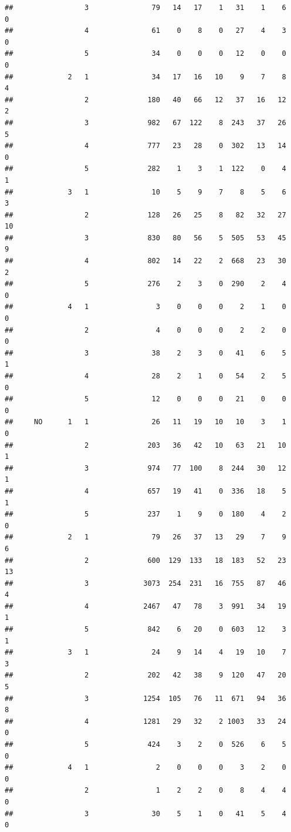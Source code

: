 \documentclass{article}\usepackage[]{graphicx}\usepackage[]{xcolor}
\makeatletter
\newenvironment{kframe}{%
 \def\at@end@of@kframe{}%
 \ifinner\ifhmode%
  \def\at@end@of@kframe{\end{minipage}}%
  \begin{minipage}{\columnwidth}%
 \fi\fi%
 \def\FrameCommand##1{\hskip\@totalleftmargin \hskip-\fboxsep
 \colorbox{shadecolor}{##1}\hskip-\fboxsep
     \hskip-\linewidth \hskip-\@totalleftmargin \hskip\columnwidth}%
 \MakeFramed {\advance\hsize-\width
   \@totalleftmargin\z@ \linewidth\hsize
   \@setminipage}}%
 {\par\unskip\endMakeFramed%
 \at@end@of@kframe}
\newenvironment{knitrout}{}{} %
\makeatother
\begin{document}
\begin{knitrout}
\begin{kframe}
\begin{verbatim}
##                 3               79   14   17    1   31    1    6    0
##                 4               61    0    8    0   27    4    3    0
##                 5               34    0    0    0   12    0    0    0
##             2   1               34   17   16   10    9    7    8    4
##                 2              180   40   66   12   37   16   12    2
##                 3              982   67  122    8  243   37   26    5
##                 4              777   23   28    0  302   13   14    0
##                 5              282    1    3    1  122    0    4    1
##             3   1               10    5    9    7    8    5    6    3
##                 2              128   26   25    8   82   32   27   10
##                 3              830   80   56    5  505   53   45    9
##                 4              802   14   22    2  668   23   30    2
##                 5              276    2    3    0  290    2    4    0
##             4   1                3    0    0    0    2    1    0    0
##                 2                4    0    0    0    2    2    0    0
##                 3               38    2    3    0   41    6    5    1
##                 4               28    2    1    0   54    2    5    0
##                 5               12    0    0    0   21    0    0    0
##     NO      1   1               26   11   19   10   10    3    1    0
##                 2              203   36   42   10   63   21   10    1
##                 3              974   77  100    8  244   30   12    1
##                 4              657   19   41    0  336   18    5    1
##                 5              237    1    9    0  180    4    2    0
##             2   1               79   26   37   13   29    7    9    6
##                 2              600  129  133   18  183   52   23   13
##                 3             3073  254  231   16  755   87   46    4
##                 4             2467   47   78    3  991   34   19    1
##                 5              842    6   20    0  603   12    3    1
##             3   1               24    9   14    4   19   10    7    3
##                 2              202   42   38    9  120   47   20    5
##                 3             1254  105   76   11  671   94   36    8
##                 4             1281   29   32    2 1003   33   24    0
##                 5              424    3    2    0  526    6    5    0
##             4   1                2    0    0    0    3    2    0    0
##                 2                1    2    2    0    8    4    4    0
##                 3               30    5    1    0   41    5    4    0

\end{verbatim}
\end{kframe}
\end{knitrout}
\end{document}
